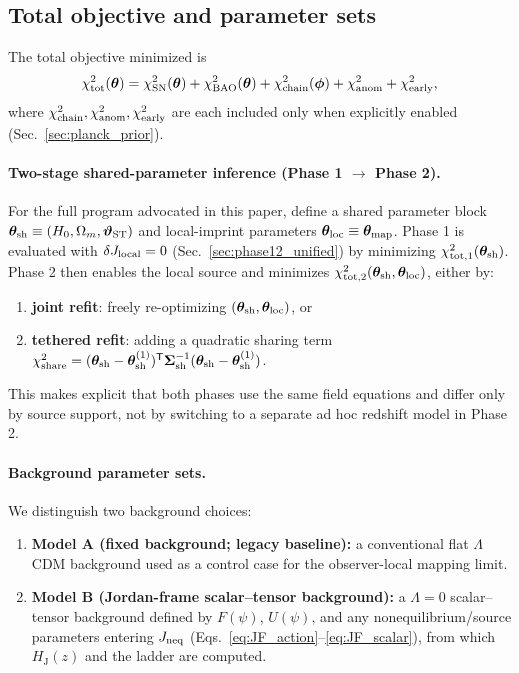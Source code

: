 \documentclass[10pt]{article}
\newcommand{\HJ}{H_{\mathrm{J}}}
\newcommand{\Fpsi}{F(\psi)}
\newcommand{\Upsi}{U(\psi)}
\begin{document}
\subsection{Total objective and parameter sets}
\label{sec:params2}

The total objective minimized is
\begin{equation}
\chi^2_{\mathrm{tot}}(\bm{\theta}) =
\chi^2_{\mathrm{SN}}(\bm{\theta})
+ \chi^2_{\mathrm{BAO}}(\bm{\theta})
+ \chi^2_{\mathrm{chain}}(\bm{\phi})
+ \chi^2_{\rm anom}
+ \chi^2_{\rm early},
\label{eq:chi2_tot}
\end{equation}
where \(\chi^2_{\mathrm{chain}},\chi^2_{\rm anom},\chi^2_{\rm early}\) are each included only when explicitly enabled
(Sec.~\ref{sec:planck_prior}).

\paragraph{Two-stage shared-parameter inference (Phase 1 \(\rightarrow\) Phase 2).}
For the full program advocated in this paper, define a shared parameter block
\(\bm{\theta}_{\rm sh}\equiv(H_0,\Omega_m,\bm{\vartheta}_{\rm ST})\) and local-imprint parameters
\(\bm{\theta}_{\rm loc}\equiv\bm{\theta}_{\rm map}\).
Phase 1 is evaluated with \(\delta J_{\rm local}=0\) (Sec.~\ref{sec:phase12_unified}) by minimizing
\(\chi^2_{{\rm tot},1}(\bm{\theta}_{\rm sh})\).
Phase 2 then enables the local source and minimizes
\(\chi^2_{{\rm tot},2}(\bm{\theta}_{\rm sh},\bm{\theta}_{\rm loc})\), either by:
\begin{enumerate}[leftmargin=1.2em]
\item \textbf{joint refit}: freely re-optimizing \((\bm{\theta}_{\rm sh},\bm{\theta}_{\rm loc})\), or
\item \textbf{tethered refit}: adding a quadratic sharing term
\(\chi^2_{\rm share}=(\bm{\theta}_{\rm sh}-\bm{\theta}_{\rm sh}^{(1)})^{\mathsf T}
\bm{\Sigma}_{\rm sh}^{-1}(\bm{\theta}_{\rm sh}-\bm{\theta}_{\rm sh}^{(1)})\).
\end{enumerate}
This makes explicit that both phases use the same field equations and differ only by source support,
not by switching to a separate ad hoc redshift model in Phase 2.

\paragraph{Background parameter sets.}
We distinguish two background choices:
\begin{enumerate}[leftmargin=1.2em]
\item \textbf{Model A (fixed background; legacy baseline):} a conventional flat \(\Lambda\)CDM background
used as a control case for the observer-local mapping limit.
\item \textbf{Model B (Jordan-frame scalar--tensor background):} a \(\Lambda=0\) scalar--tensor background
defined by \(\Fpsi\), \(\Upsi\), and any nonequilibrium/source parameters entering \(J_{\rm neq}\)
(Eqs.~\eqref{eq:JF_action}--\eqref{eq:JF_scalar}), from which \(\HJ(z)\) and the ladder are computed.
\end{enumerate}
\end{document}
